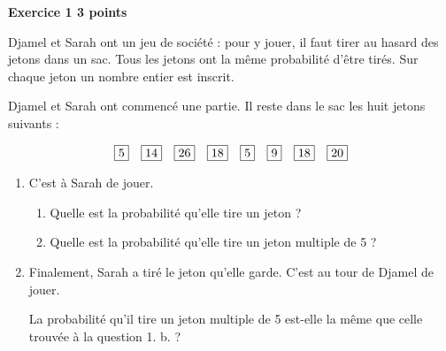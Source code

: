 \textbf{Exercice 1 \hfill 3 points}

\medskip

Djamel et Sarah ont un jeu de société : pour y jouer, il faut tirer au hasard des jetons dans un sac. Tous les jetons ont la même probabilité d'être tirés. Sur chaque jeton un nombre entier est inscrit.

\smallskip

Djamel et Sarah ont commencé une partie. Il reste dans le sac les huit jetons suivants :

\[\fbox{5}\quad \fbox{14}\quad\fbox{26}\quad\fbox{18}\quad\fbox{5}\quad\fbox{9}\quad\fbox{18}\quad\fbox{20}\]

\begin{enumerate}
\item C'est à Sarah de jouer.
	\begin{enumerate}
		\item Quelle est la probabilité qu'elle tire un jeton  \fg{}?
		\item Quelle est la probabilité qu'elle tire un jeton multiple de 5 ?
	\end{enumerate}
\item  Finalement, Sarah a tiré le jeton  \fg{} qu'elle garde. C'est au tour de Djamel de jouer.
	
La probabilité qu'il tire un jeton multiple de 5 est-elle la même que celle trouvée à la question 1. b. ?

\end{enumerate}

\vspace{0,5cm}

